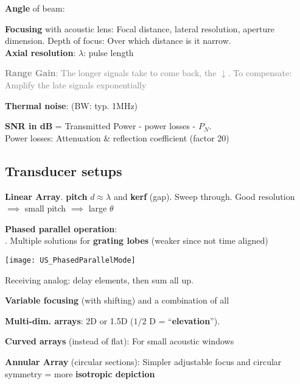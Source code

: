 \textbf{Angle} of beam: 

\textbf{Focusing} with acoustic lens: Focal distance, lateral resolution, aperture dimension. Depth of focus: Over which distance is it narrow.\vspace{-1mm} \\
\textbf{Axial resolution}:  \quad $\lambda$: pulse length

\textcolor{gray}{ \textbf{Range Gain}: The longer signals take to come back, the $\downarrow$. To compensate: Amplify the late signals exponentially }

\textbf{Thermal noise}:  \hfill (BW: typ. 1MHz)

\textbf{SNR in dB} = Transmitted Power - power losses - $P_N$.\\
Power losses: Attenuation \& reflection coefficient (factor 20)
\subsection{Transducer setups}
%
\textbf{Linear Array}. \textbf{pitch} $d \approx \lambda$ and \textbf{kerf} (gap). Sweep through. Good resolution $\implies$ small pitch $\implies$ large $\theta$

\begin{minipage}{0.64\linewidth}
    \textbf{Phased parallel operation}:\\
    . Multiple solutions for  \textbf{grating lobes} (weaker since not time aligned)
\end{minipage} \hfill
\begin{minipage}{0.35\linewidth}
    \texttt{[image: US\_PhasedParallelMode]}
\end{minipage}

Receiving analog: delay elements, then sum all up.

\textbf{Variable focusing} (with shifting) and a combination of all

\textbf{Multi-dim. arrays}: 2D or 1.5D ($1/2$ D = ``\textbf{elevation}'').

\textbf{Curved arrays} (instead of flat): For small acoustic windows

\textbf{Annular Array} (circular sections): Simpler adjustable focus and circular symmetry = more \textbf{isotropic depiction}
